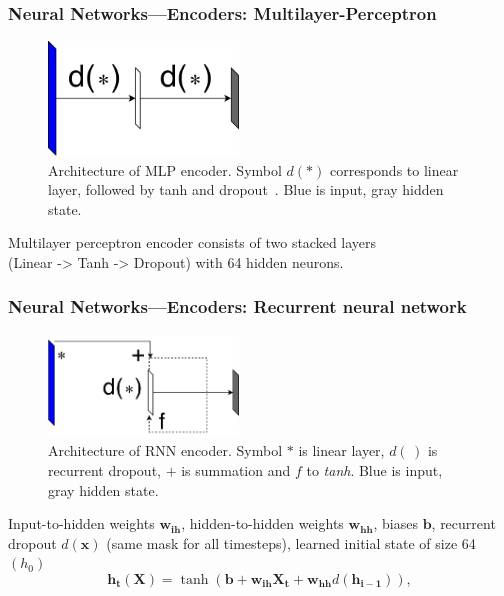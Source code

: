 \documentclass{beamer}
\begin{document}
\begin{frame}
  \frametitle{Neural Networks---Encoders: Multilayer-Perceptron}
  \begin{figure}[h]
    \centering
   \includegraphics[width=0.45\textwidth]{mlp_encoder} 
   \caption*{%
     Architecture of \textsc{MLP} encoder. Symbol $d(\ast)$ corresponds to linear layer, followed by tanh and dropout~.
     Blue is input, gray hidden state.
   }
  \end{figure}
  \vspace{-0.5cm}
    Multilayer perceptron encoder consists of two stacked layers\\(Linear -> Tanh -> Dropout) with 64 hidden neurons.
\end{frame}

\begin{frame}
  \frametitle{Neural Networks---Encoders: Recurrent neural network}
  \begin{figure}[h]
    \centering
   \includegraphics[width=0.45\textwidth]{rnn_encoder} 
   \caption*{%
     Architecture of \textsc{RNN} encoder. Symbol $\ast$ is linear layer, $d(\,)$ is recurrent dropout, $+$ is summation and $f$ to \textit{tanh}.
     Blue is input, gray hidden state.
   }
  \end{figure}
  \vspace{-0.5cm}
Input-to-hidden weights $\bm{w_{ih}}$, hidden-to-hidden weights $\bm{w_{hh}}$, biases $\bm{b}$,
    recurrent dropout $d(\bm{x})$ (same mask for all timesteps), learned initial state of size 64 $(h_0)$
  \begin{equation*}
    \bm{h_t} (\bm{X}) = \operatorname{tanh} \left( \bm{b} + \bm{w_{ih}} \bm{X_t} + \bm{w_{hh}} d (\bm{h_{i-1}}) \right),
  \end{equation*}
\end{frame}
\end{document}
